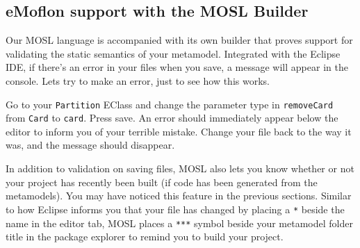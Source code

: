 \newpage
\texHeader

\hypertarget{validation tex}{} 
\subsection{eMoflon support with the MOSL Builder }

Our MOSL language is accompanied with its own builder that proves support for validating the static semantics of your metamodel.
Integrated with the Eclipse IDE, if there's an error in your files when you save, a message will appear in the console. Lets try to make an error, just to
see how this works.

Go to your \texttt{Partition} EClass and change the parameter type in \texttt{removeCard} from \texttt{Card} to \texttt{card}. Press save. An error should
immediately appear below the editor to inform you of your terrible mistake. Change your file back to the way it was, and the message should disappear.

In addition to validation on saving files, MOSL also lets you know whether or not your project has
recently been built (if code has been generated from the metamodels). You may have noticed this feature in the previous sections. Similar to how Eclipse
informs you that your file has changed by placing a \texttt{*} beside the name in the editor tab, MOSL places a \texttt{***} symbol beside your metamodel folder
title in the package explorer to remind you to build your project.

